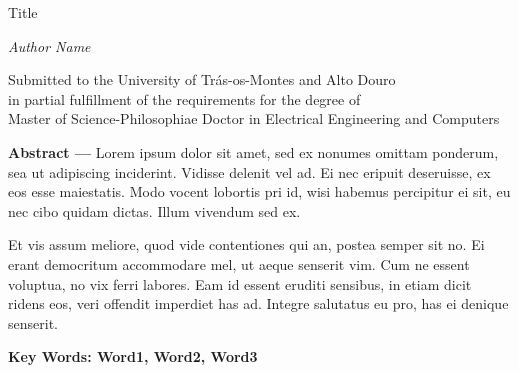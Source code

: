 
\begin{center}
\large{Title}

\vskip5mm
\normalsize{\textit{Author Name}}

\vskip5mm
\small{Submitted to the University of Trás-os-Montes and Alto Douro \\
in partial fulfillment of the requirements for the degree of \\
Master of Science-Philosophiae Doctor in Electrical Engineering and Computers}
\end{center}

\textbf{Abstract ---} 
Lorem ipsum dolor sit amet, sed ex nonumes omittam ponderum, sea ut adipiscing inciderint. Vidisse delenit vel ad. Ei nec eripuit deseruisse, ex eos esse maiestatis. Modo vocent lobortis pri id, wisi habemus percipitur ei sit, eu nec cibo quidam dictas. Illum vivendum sed ex.

Et vis assum meliore, quod vide contentiones qui an, postea semper sit no. Ei erant democritum accommodare mel, ut aeque senserit vim. Cum ne essent voluptua, no vix ferri labores. Eam id essent eruditi sensibus, in etiam dicit ridens eos, veri offendit imperdiet has ad. Integre salutatus eu pro, has ei denique senserit.

\textbf{Key Words: Word1, Word2, Word3} 

